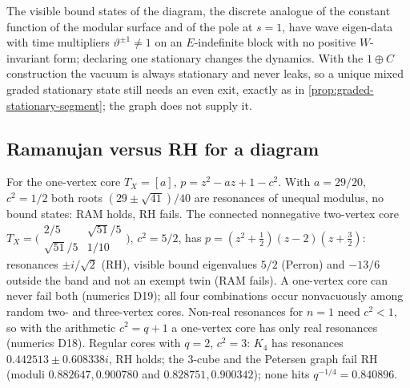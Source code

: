 \begin{observation}
\label{obs:cusp-no-graph-vacuum}
The visible bound states of the diagram, the discrete analogue of the constant function of the modular
surface and of the pole at $s = 1$, have wave eigen-data with time multipliers $\vartheta^{\pm1}\ne1$ on an
$E$-indefinite block with no positive $W$-invariant form; declaring one stationary changes the dynamics.
With the $1\oplus C$ construction the vacuum is always stationary and never leaks, so a unique mixed
graded stationary state still needs an even exit, exactly as in \cref{prop:graded-stationary-segment};
the graph does not supply it.
\end{observation}

\subsection{Ramanujan versus RH for a diagram}

\begin{proposition}
\label{prop:cusp-ram-rh-independent}
For the one-vertex core $T_X = [a]$, $p = z^2-az+1-c^2$. With $a = 29/20$, $c^2 = 1/2$ both roots
$(29\pm\sqrt{41})/40$ are resonances of unequal modulus, no bound states: RAM holds, RH fails. The connected
nonnegative two-vertex core $T_X = \big(\begin{smallmatrix}2/5&\sqrt{51}/5\\ \sqrt{51}/5&1/10\end{smallmatrix}\big)$,
$c^2 = 5/2$, has $p = (z^2+\tfrac12)(z-2)(z+\tfrac32)$: resonances $\pm i/\sqrt2$ (RH), visible bound
eigenvalues $5/2$ (Perron) and $-13/6$ outside the band and not an exempt twin (RAM fails). A one-vertex core
can never fail both (numerics D19); all four combinations occur nonvacuously among random two- and
three-vertex cores. Non-real resonances for $n = 1$ need $c^2<1$, so with the arithmetic $c^2 = q+1$ a
one-vertex core has only real resonances (numerics D18). Regular cores with $q = 2$, $c^2 = 3$: $K_4$ has
resonances $0.442513\pm0.608338i$, RH holds; the $3$-cube and the Petersen graph fail RH (moduli
$0.882647, 0.900780$ and $0.828751, 0.900342$); none hits $q^{-1/4} = 0.840896$.
\end{proposition}

